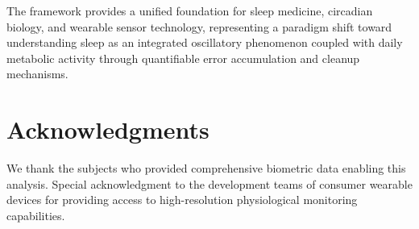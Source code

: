 \documentclass[twocolumn]{article}
\begin{document}
The framework provides a unified foundation for sleep medicine, circadian biology, and wearable sensor technology, representing a paradigm shift toward understanding sleep as an integrated oscillatory phenomenon coupled with daily metabolic activity through quantifiable error accumulation and cleanup mechanisms.

\section*{Acknowledgments}

We thank the subjects who provided comprehensive biometric data enabling this analysis. Special acknowledgment to the development teams of consumer wearable devices for providing access to high-resolution physiological monitoring capabilities.



\end{document}
